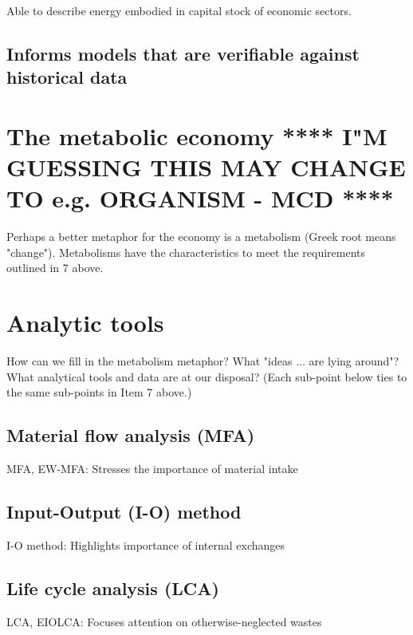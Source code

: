 Able to describe energy embodied in capital stock of economic sectors.

\subsection{Informs models that are verifiable against historical data}
\label{sec:verifiable}

\section{The metabolic economy **** I"M GUESSING THIS MAY CHANGE TO e.g. ORGANISM - MCD ****}
\label{sec:metabolism}

Perhaps a better metaphor for the economy is a metabolism (Greek root means "change"). 
     Metabolisms have the characteristics to meet the requirements outlined in 7 above.


\section{Analytic tools}
\label{sec:analytic_tools}

How can we fill in the metabolism metaphor? What "ideas ... are lying around"?
What analytical tools and data are at our disposal?
(Each sub-point below ties to the same sub-points in Item 7 above.)

\subsection{Material flow analysis (MFA)}
\label{sec:MFA}

MFA, EW-MFA: Stresses the importance of material intake

\subsection{Input-Output (I-O) method}
\label{sec:I-O}

I-O method: Highlights importance of internal exchanges

\subsection{Life cycle analysis (LCA)}
\label{sec:LCA}

LCA, EIOLCA: Focuses attention on otherwise-neglected wastes

